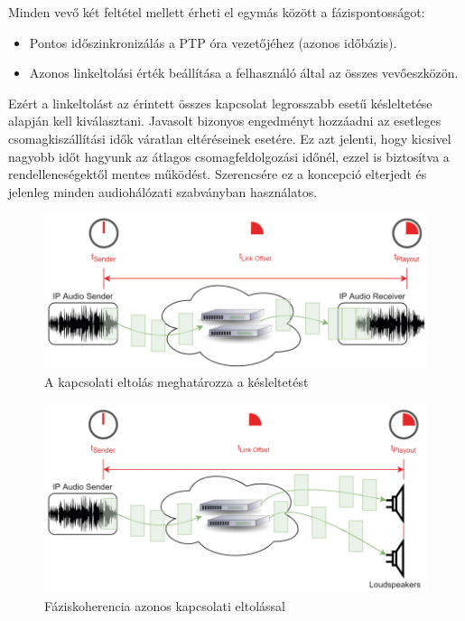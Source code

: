 Minden vevő két feltétel mellett érheti el egymás között a fázispontosságot:
\begin{itemize}
	\item Pontos időszinkronizálás a PTP óra vezetőjéhez (azonos időbázis).
	\item Azonos linkeltolási érték beállítása a felhasználó által az összes vevőeszközön.
\end{itemize}
Ezért a linkeltolást az érintett összes kapcsolat legrosszabb esetű késleltetése alapján kell kiválasztani. 
Javasolt bizonyos engedményt hozzáadni az esetleges csomagkiszállítási idők váratlan eltéréseinek esetére.
Ez azt jelenti, hogy kicsivel nagyobb időt hagyunk az átlagos csomagfeldolgozási időnél, 
ezzel is biztosítva a rendelleneségektől mentes működést.
Szerencsére ez a koncepció elterjedt és jelenleg minden audiohálózati szabványban használatos. 
\begin{figure}[H]
	\centering
	\includegraphics[width=\linewidth, keepaspectratio]{figures/link_offset_latency.png}
	\caption{A kapcsolati eltolás meghatározza a késleltetést~\cite{AHNERT2023}}
	\label {fig:link_offset_latency}
\end{figure}
\begin{figure}[H]
	\centering
	\includegraphics[width=\linewidth, keepaspectratio]{figures/phase_coherence_link_offset.png}
	\caption{Fáziskoherencia azonos kapcsolati eltolással~\cite{AHNERT2023}}
	\label {fig:phase_coherence_link_offset}
\end{figure}

